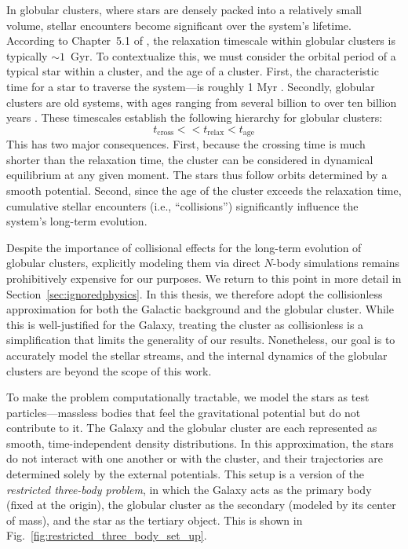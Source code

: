     In globular clusters, where stars are densely packed into a relatively small volume, stellar encounters become significant over the system's lifetime. According to Chapter~5.1 of \citet{bovy_inprep}, the relaxation timescale within globular clusters is typically $\sim1$~Gyr. To contextualize this, we must consider the orbital period of a typical star within a cluster, and the age of a cluster. First, the characteristic time for a star to traverse the system—is roughly 1 Myr \citep[which can be estimated as the size of a system divided by its internal velocity dispersion][]{2018MNRAS.478.1520B}. Secondly, globular clusters are old systems, with ages ranging from several billion to over ten billion years \citep{2013ApJ...775..134V}. These timescales establish the following hierarchy for globular clusters:
    \begin{equation*}
        t_\mathrm{cross} << t_\mathrm{relax} < t_\mathrm{age}
    \end{equation*}
    This has two major consequences. First, because the crossing time is much shorter than the relaxation time, the cluster can be considered in dynamical equilibrium at any given moment. The stars thus follow orbits determined by a smooth potential. Second, since the age of the cluster exceeds the relaxation time, cumulative stellar encounters (i.e., ``collisions'') significantly influence the system's long-term evolution.

    Despite the importance of collisional effects for the long-term evolution of globular clusters, explicitly modeling them via direct $N$-body simulations remains prohibitively expensive for our purposes. We return to this point in more detail in Section~\ref{sec:ignoredphysics}. In this thesis, we therefore adopt the collisionless approximation for both the Galactic background and the globular cluster. While this is well-justified for the Galaxy, treating the cluster as collisionless is a simplification that limits the generality of our results. Nonetheless, our goal is to accurately model the stellar streams, and the internal dynamics of the globular clusters are beyond the scope of this work.

    To make the problem computationally tractable, we model the stars as test particles—massless bodies that feel the gravitational potential but do not contribute to it. The Galaxy and the globular cluster are each represented as smooth, time-independent density distributions. In this approximation, the stars do not interact with one another or with the cluster, and their trajectories are determined solely by the external potentials. This setup is a version of the \textit{restricted three-body problem}, in which the Galaxy acts as the primary body (fixed at the origin), the globular cluster as the secondary (modeled by its center of mass), and the star as the tertiary object. This is shown in Fig.~\ref{fig:restricted_three_body_set_up}.

